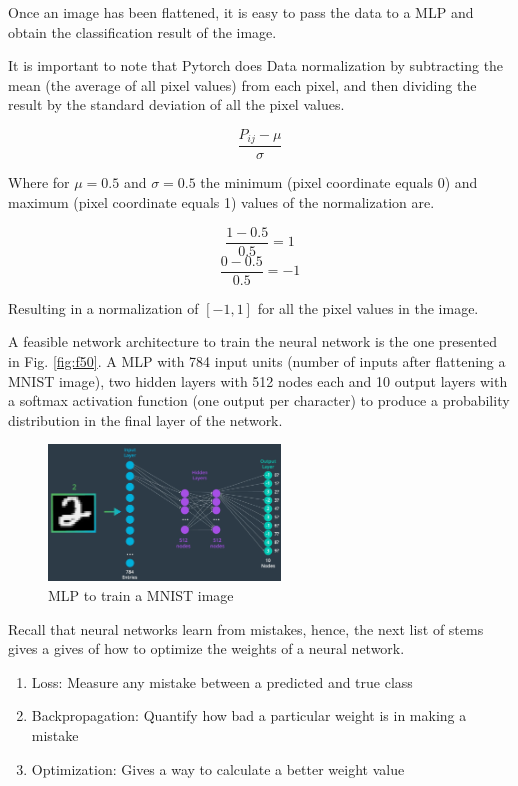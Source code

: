\documentclass{article}
\begin{document}
Once an image has been flattened, it is easy to pass the data to a MLP and obtain the classification result of the image.

It is important to note that Pytorch does Data normalization by subtracting the mean (the average of all pixel values) from each pixel, and then dividing the result by the standard deviation of all the pixel values.

\[\frac{P_{ij} - \mu}{\sigma}\]

Where for \(\mu = 0.5\) and \(\sigma=0.5\) the minimum (pixel coordinate equals 0) and maximum (pixel coordinate equals 1) values of the normalization are.

\[\frac{1 - 0.5}{0.5} = 1\]
\[\frac{0 - 0.5}{0.5} = -1\]

Resulting in a normalization of \([-1,1]\) for all the pixel values in the image.

A feasible network architecture to train the neural network is the one presented in Fig. \ref{fig:f50}. A MLP with 784 input units (number of inputs after flattening a MNIST image), two hidden layers with 512 nodes each and 10 output layers with a softmax activation function (one output per character) to produce a probability distribution in the final layer of the network.

\begin{figure}[ht]
    \centering
    \includegraphics[width=0.55\textwidth,height=0.55\textheight,keepaspectratio]{images/mlp.png}
    \captionsetup{justification=centering}
    \caption{MLP to train a MNIST image}
    \label{fig:f5}
\end{figure}

Recall that neural networks learn from mistakes, hence, the next list of stems gives a gives of how to optimize the weights of a neural network.

\begin{enumerate}
  \item Loss: Measure any mistake between a predicted and true class
  \item Backpropagation: Quantify how bad a particular weight is in making a mistake
  \item Optimization: Gives a way to calculate a better weight value
\end{enumerate}
\end{document}

